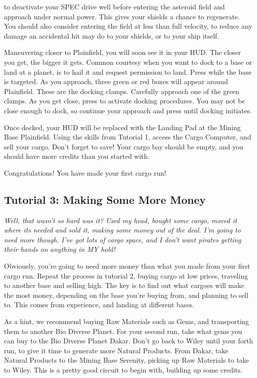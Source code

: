 \documentclass{article}
\newcommand{\key}[1]{%
  \tikz[baseline=(key.base)]{
    \node[draw=gray!50, fill=gray!5, rounded corners=2pt, inner sep=2pt, minimum height=1.5ex] (key) {\footnotesize\sffamily\bfseries #1};
  }%
}
\begin{document}
\key{a} to deactivate your SPEC drive well before entering the asteroid field and approach under normal power. This gives your shields a chance to regenerate. You should also consider entering the field at less than full velocity, to reduce any damage an accidental hit may do to your shields, or to your ship itself. 

Maneuvering closer to Plainfield, you will soon see it in your HUD. The closer you get, the bigger it gets.  Common courtesy when you want to dock to a base or land at a planet, is to hail it and request permission to land. Press \key{0} while the base is targeted. As you approach, three green or red boxes will appear around Plainfield. These are the docking clamps. Carefully approach one of the green clamps. As you get close, press \key{d} to activate docking procedures. You may not be close enough to dock, so continue your approach and press \key{d} until docking initiates. 

Once docked, your HUD will be replaced with the Landing Pad at the Mining Base Plainfield. Using the skills from Tutorial 1, access the Cargo Computer, and sell your cargo. Don't forget to save! Your cargo bay should be empty, and you should have more credits than you started with. 

Congratulations! You have made your first cargo run! 





\subsection{ Tutorial 3: Making Some More Money }

\textit{Well, that wasn't so hard was it? Used my head, bought some cargo, moved it where its needed and sold it, making some money out of the deal. I'm going to need more though. I've got lots of cargo space, and I don't want pirates getting their hands on anything in MY hold! }

Obviously, you're going to need more money than what you made from your first cargo run. Repeat the process in tutorial 2, buying cargo at low prices, traveling to another base and selling high. The key is to find out what cargoes will make the most money, depending on the base you're buying from, and planning to sell to. This comes from experience, and landing at different bases. 

As a hint, we recommend buying Raw Materials such as Gems, and transporting them to another Bio Diverse Planet. For your second run, take what gems you can buy to the Bio Diverse Planet Dakar. Don't go back to Wiley until your forth run, to give it time to generate more Natural Products. From Dakar, take Natural Products to the Mining Base Serenity, picking up Raw Materials to take to Wiley. This is a pretty good circuit to begin with, building up some credits. 
\end{document}
